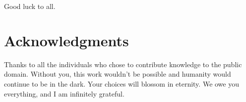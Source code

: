 \documentclass[10pt,twocolumn,letterpaper]{article}
\begin{document}
Good luck to all.

\section{Acknowledgments}

Thanks to all the individuals who chose to contribute knowledge to the public domain. Without you, this work wouldn't be possible and humanity would continue to be in the dark. Your choices will blossom in eternity. We owe you everything, and I am infinitely grateful.

\clearpage
\twocolumn

{\small


}
\end{document}

